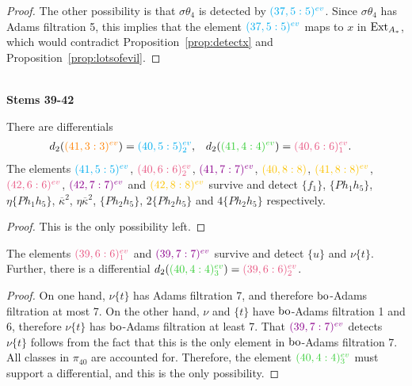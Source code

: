 \begin{proof}
The other possibility is that $\sigma\theta_4$ is detected by $\evr{37}{5}{cyan}$. Since $\sigma\theta_4$ has Adams filtration 5, this implies that the element $\evr{37}{5}{cyan}$ maps to $x$ in $\Ex$, which would contradict Proposition~\ref{prop:detectx} and Proposition~\ref{prop:lotsofevil}.
\end{proof}


\ \\
\noindent
{\bf Stems 39-42}

\noindent


\begin{prop}
There are differentials
\begin{align*}
d_2(\evr{41}{3}{orange}) &= \evrm{40}{5}{cyan}{2}, & d_2(\evr{41}{4}{limegreen}) &= \evrm{40}{6}{lavenderrose}{1}.
\end{align*} 
The elements  $\evr{41}{5}{cyan}$, $\evrm{40}{6}{lavenderrose}{2}$, $\evr{41}{7}{darkmagenta}$, $\gdr{40}{8}{8}{goldenpoppy}$, $\evr{41}{8}{goldenpoppy}$, $\evr{42}{6}{lavenderrose}$, $\evr{42}{7}{darkmagenta}$ and $\evr{42}{8}{goldenpoppy}$ survive and detect $\{f_1\}$, $\{Ph_1h_5\}$, $\eta\{Ph_1h_5\}$, $\overline{\kappa}^2$, $\eta\overline{\kappa}^2$, $\{Ph_2h_5\}$, $2\{Ph_2h_5\}$ and $4\{Ph_2h_5\}$ respectively.
\end{prop}

\begin{proof}
This is the only possibility left.
\end{proof}

\begin{prop}
The elements $\evrm{39}{6}{lavenderrose}{1}$ and $\evr{39}{7}{darkmagenta}$ survive and detect $\{u\}$ and $\nu\{t\}$. Further, there is a differential $d_2(\evrm{40}{4}{limegreen}{3}) = \evrm{39}{6}{lavenderrose}{2}$.
\end{prop}

\begin{proof}
On one hand, $\nu\{t\}$ has Adams filtration 7, and therefore $\bo$-Adams filtration at most 7. On the other hand, $\nu$ and $\{t\}$ have $\bo$-Adams filtration 1 and 6, therefore $\nu\{t\}$ has $\bo$-Adams filtration at least 7. 
That $\evr{39}{7}{darkmagenta}$ detects $\nu\{t\}$ follows from the fact that this is the only element in $\bo$-Adams filtration 7.
All classes in $\pi_{40}$ are accounted for. Therefore, the element $\evrm{40}{4}{limegreen}{3}$ must support a differential, and this is the only possibility.
\end{proof}

